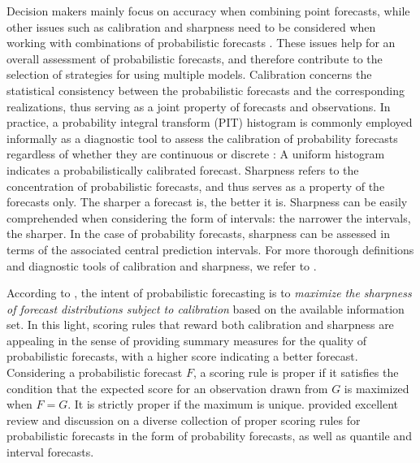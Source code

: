 \documentclass[11pt]{article}
\begin{document}
Decision makers mainly focus on accuracy when combining point forecasts, while other issues such as calibration and sharpness need to be considered when working with combinations of probabilistic forecasts \citep{Gneiting2007-fr,Gneiting2007-ij,Lahiri2015-qq}. These issues help for an overall assessment of probabilistic forecasts, and therefore contribute to the selection of strategies for using multiple models. Calibration concerns the statistical consistency between the probabilistic forecasts and the corresponding realizations, thus serving as a joint property of forecasts and observations. In practice, a probability integral transform (PIT) histogram is commonly employed informally as a diagnostic tool to assess the calibration of probability forecasts regardless of whether they are continuous \citep{Dawid1984-vp,Diebold1997-cr} or discrete \citep{Gneiting2013-hl}: A uniform histogram indicates a probabilistically calibrated forecast. Sharpness refers to the concentration of probabilistic forecasts, and thus serves as a property of the forecasts only. The sharper a forecast is, the better it is. Sharpness can be easily comprehended when considering the form of intervals: the narrower the intervals, the sharper. In the case of probability forecasts, sharpness can be assessed in terms of the associated central prediction intervals. For more thorough definitions and diagnostic tools of calibration and sharpness, we refer to \citet{Gneiting2014-tz}.

According to \citet{Gneiting2007-fr}, the intent of probabilistic forecasting is to \textit{maximize the sharpness of forecast distributions subject to calibration} based on the available information set. In this light, scoring rules that reward both calibration and sharpness are appealing in the sense of providing summary measures for the quality of probabilistic forecasts, with a higher score indicating a better forecast. Considering a probabilistic forecast $F$, a scoring rule is proper if it satisfies the condition that the expected score for an observation drawn from $G$ is maximized when $F=G$. It is strictly proper if the maximum is unique. \citet{Gneiting2007-ij} provided excellent review and discussion on a diverse collection of proper scoring rules for probabilistic forecasts in the form of probability forecasts, as well as quantile and interval forecasts.
\end{document}
